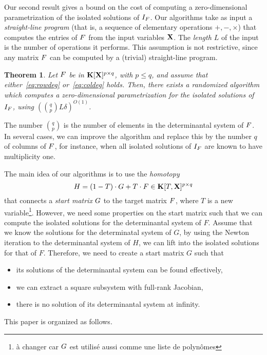 \documentclass[12pt]{article}
\newtheorem{theorem}[definition]{Theorem}
\begin{document}
Our second result gives a bound on the cost of computing a
zero-dimensional parametrization of the isolated solutions of
$I_{{F}}$. Our algorithms take as input a \emph{straight-line program}
(that is, a sequence of elementary operations $+, -, \times$) that
computes the entries of ${F}$ from the input variables $\mathbf{X}$. The
\emph{length $L$} of the input is the number of operations it
performs. This assumption is not restrictive, since any matrix ${F}$
can be computed by a (trivial) straight-line program.

\begin{theorem}
  Let ${F}$ be in $\mathbf{K}[\mathbf{X}]^{p \times q}$, with $p \le q$, and assume
  that either~\eqref{eq:rowdeg} or~\eqref{eq:coldeg} holds. Then,
  there exists a randomized algorithm which computes a
  zero-dimensional parametrization for the isolated solutions of
  $I_{{F}}$, using $({q \choose p} L \delta)^{O(1)}$.
\end{theorem}
The number ${q \choose p}$ is the number of elements in the
determinantal system of ${F}$. In several cases, we can improve the
algorithm and replace this by the number $q$ of columns of ${F}$,
for instance, when all isolated solutions of $I_{{F}}$ are known
to have multiplicity one.

The main idea of our algorithms is to use the \emph{homotopy}
\[{H} = (1-T)\cdot {G} + T \cdot {F} \in \mathbf{K}[T, \mathbf{X}]^{p \times q}\]
that connects a \emph{start matrix} ${G}$ to the target matrix ${F}$,
where $T$ is a new variable\footnote{\`a changer car ${G}$ est
  utilis\'e aussi comme une liste de polyn\^omes}. However, we need
some properties on the start matrix such that we can compute the
isolated solutions for the determinantal system of $F$. Assume that we
know the solutions for the determinatal system of $G$, by using the
Newton iteration to the determinantal system of $H$, we can lift into
the isolated solutions for that of $F$. Therefore, we need to create a
start matrix $G$ such that
\begin{itemize}
\item its solutions of the determinantal system can be found effectively,
\item we can extract a square subsystem with full-rank Jacobian,
\item there is no solution of its determinantal system at infinity. 
\end{itemize}

This paper is organized as follows.

\end{document}

